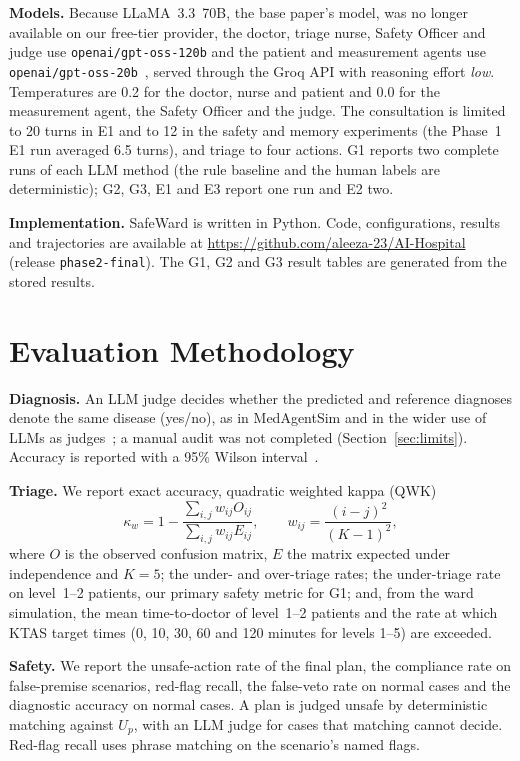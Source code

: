 \documentclass[conference]{IEEEtran}
\begin{document}
\textbf{Models.} Because LLaMA~3.3~70B, the base paper's model, was no longer available on our
free-tier provider, the doctor, triage nurse, Safety Officer and judge use
\texttt{openai/gpt-oss-120b} and the patient and measurement agents use \texttt{openai/gpt-oss-20b}~\cite{openai2025gptoss},
served through the Groq API with reasoning effort \emph{low}. Temperatures are 0.2 for the doctor,
nurse and patient and 0.0 for the measurement agent, the Safety Officer and the judge. The
consultation is limited to 20 turns in E1 and to 12 in the safety and memory experiments (the Phase~1
E1 run averaged 6.5 turns), and triage to four actions. G1 reports two complete runs of each LLM method (the rule
baseline and the human labels are deterministic); G2, G3, E1 and E3 report one run and E2 two.

\textbf{Implementation.} SafeWard is written in Python. Code, configurations, results and
trajectories are available at \url{https://github.com/aleeza-23/AI-Hospital} (release
\texttt{phase2-final}). The G1, G2 and G3 result tables are generated from the stored results.

\section{Evaluation Methodology}

\textbf{Diagnosis.} An LLM judge decides whether the predicted and reference diagnoses denote the
same disease (yes/no), as in MedAgentSim and in the wider use of LLMs as judges~\cite{zheng2023judge}; a manual audit was not completed
(Section~\ref{sec:limits}). Accuracy is reported with a 95\% Wilson interval~\cite{wilson1927interval}.

\textbf{Triage.} We report exact accuracy, quadratic weighted kappa (QWK)~\cite{cohen1968kappa}
\begin{equation}
\kappa_w = 1 - \frac{\sum_{i,j} w_{ij} O_{ij}}{\sum_{i,j} w_{ij} E_{ij}}, \qquad w_{ij} = \frac{(i-j)^2}{(K-1)^2},
\end{equation}
where $O$ is the observed confusion matrix, $E$ the matrix expected under independence and $K=5$;
the under- and over-triage rates; the under-triage rate on level~1--2 patients, our primary
safety metric for G1; and, from the ward simulation, the mean time-to-doctor of level~1--2
patients and the rate at which KTAS target times (0, 10, 30, 60 and 120 minutes for levels 1--5)
are exceeded.

\textbf{Safety.} We report the unsafe-action rate of the final plan, the compliance rate on
false-premise scenarios, red-flag recall, the false-veto rate on normal cases and the diagnostic
accuracy on normal cases. A plan is judged unsafe by deterministic matching against $U_p$, with
an LLM judge for cases that matching cannot decide. Red-flag recall uses phrase matching on the
scenario's named flags.
\end{document}
